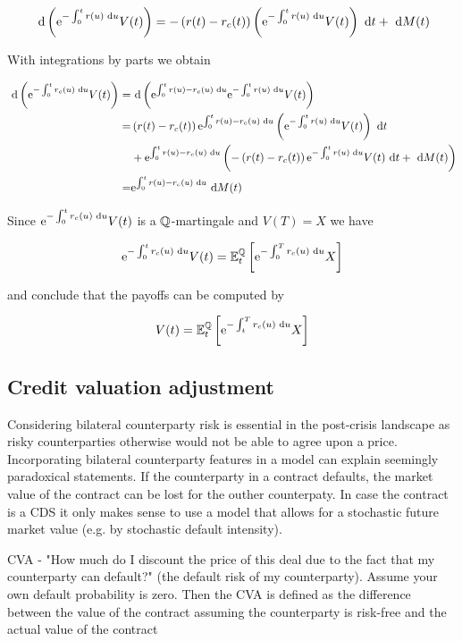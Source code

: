 $$
\text{ d} \left(\mathrm{e}^{-\int_{0}^{t} r(u) \text{ d}  u} V(t)\right)=-\left(r(t)-r_{c}(t)\right)\left(\mathrm{e}^{-\int_{0}^{t} r(u) \text{ d}  u} V(t)\right) \text{ d}  t+\text{ d}  M(t)
$$

With integrations by parts we obtain

$$
\begin{aligned}
\text{ d} \left(\mathrm{e}^{-\int_{0}^{t} r_{c}(u) \text{ d}  u} V(t)\right)= & \text{ d} \left(\mathrm{e}^{\int_{0}^{t} r(u)-r_{c}(u) \text{ d}  u} \mathrm{e}^{-\int_{0}^{t} r(u) \text{ d}  u} V(t)\right) \\
= & \left(r(t)-r_{c}(t)\right) \mathrm{e}^{\int_{0}^{t} r(u)-r_{c}(u) \text{ d}  u}\left(\mathrm{e}^{-\int_{0}^{t} r(u) \text{ d}  u} V(t)\right) \text{ d}  t \\
& +\mathrm{e}^{\int_{0}^{t} r(u)-r_{c}(u) \text{ d}  u}\left(-\left(r(t)-r_{c}(t)\right) \mathrm{e}^{-\int_{0}^{t} r(u) \text{ d}  u} V(t) \text{ d}  t+\text{ d}  M(t)\right) \\
= & \mathrm{e}^{\int_{0}^{t} r(u)-r_{c}(u) \text{ d}  u} \text{ d}  M(t)
\end{aligned}
$$

Since $\mathrm{e}^{-\int_{0}^{t} r_{c}(u) \text{ d}  u} V(t)$ is a $\mathbb{Q}$-martingale and $V(T)=X$ we have

$$
\mathrm{e}^{-\int_{0}^{t} r_{c}(u) \text{ d}  u} V(t)=\mathbb{E}_{t}^{\mathbb{Q}}\left[\mathrm{e}^{-\int_{0}^{T} r_{c}(u) \text{ d}  u} X\right]
$$

and conclude that the payoffs can be computed by

$$
V(t)=\mathbb{E}_{t}^{\mathbb{Q}}\left[\mathrm{e}^{-\int_{t}^{T} r_{c}(u) \text{ d}  u} X\right]
$$

\subsection{Credit valuation adjustment}
Considering bilateral counterparty risk is essential in the post-crisis landscape as risky counterparties otherwise would not be able to agree upon a price. Incorporating bilateral counterparty features in a model can explain seemingly paradoxical statements. If the counterparty in a contract defaults, the market value of the contract can be lost for the outher counterpaty. In case the contract is a CDS it only makes sense to use a model that allows for a stochastic future market value (e.g. by stochastic default intensity).

CVA - "How much do I discount the price of this deal due to the fact that my counterparty can default?" (the default risk of my counterparty). Assume your own default probability is zero. Then the CVA is defined as the difference between the value of the contract assuming the counterparty is risk-free and the actual value of the contract

